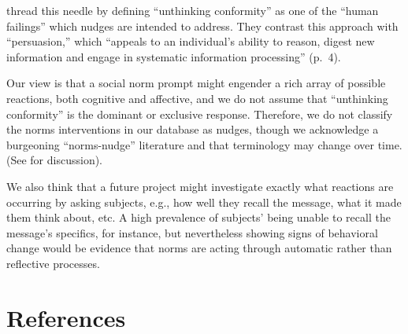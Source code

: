 \documentclass[sn-nature,pdflatex]{sn-jnl}
\begin{document}
\citep{mols2015} thread this needle by defining ``unthinking
conformity'' as one of the ``human failings'' which nudges are intended
to address. They contrast this approach with ``persuasion,'' which
``appeals to an individual's ability to reason, digest new information
and engage in systematic information processing'' (p.~4).

Our view is that a social norm prompt might engender a rich array of
possible reactions, both cognitive and affective, and we do not assume
that ``unthinking conformity'' is the dominant or exclusive response.
Therefore, we do not classify the norms interventions in our database as
nudges, though we acknowledge a burgeoning ``norms-nudge'' literature
and that terminology may change over time. (See \citep{bicchieri2023}
for discussion).

We also think that a future project might investigate exactly what
reactions are occurring by asking subjects, e.g., how well they recall
the message, what it made them think about, etc. A high prevalence of
subjects' being unable to recall the message's specifics, for instance,
but nevertheless showing signs of behavioral change would be evidence
that norms are acting through automatic rather than reflective
processes.

\newpage

\section{References}\label{references}


\end{document}
